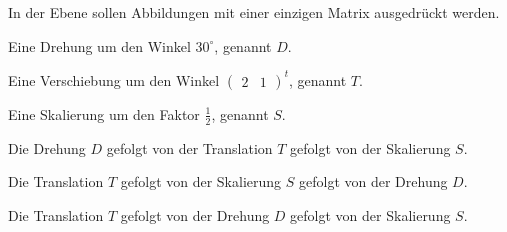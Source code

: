 In der Ebene sollen Abbildungen mit einer einzigen Matrix ausgedrückt werden.
\begin{teilaufgaben}
\item
Eine Drehung um den Winkel $30^\circ$, genannt $D$.
\item
Eine Verschiebung um den Winkel $\begin{pmatrix}2&1\end{pmatrix}^t$,
genannt $T$.
\item
Eine Skalierung um den Faktor $\frac12$, genannt $S$.
\item
Die Drehung $D$ gefolgt von der Translation $T$ gefolgt von der Skalierung $S$.
\item
Die Translation $T$ gefolgt von der Skalierung $S$ gefolgt von der Drehung $D$.
\item
Die Translation $T$ gefolgt von der Drehung $D$ gefolgt von der Skalierung $S$.
\end{teilaufgaben}

